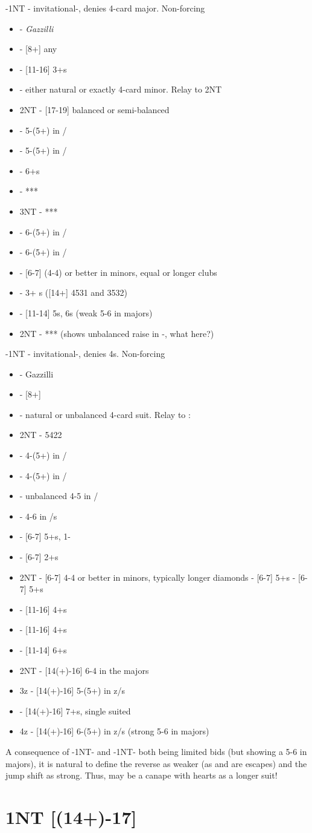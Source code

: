 \documentclass[12pt]{report}
\newcommand{\q}[1]{\multido{}{#1}{\qquad}}
\newcommand{\ul}[1]{\begin{itemize}#1\end{itemize}}
\newcommand{\li}[1]{\item[~] \q{#1}}
\newcommand{\bidsection}[2]{\section{\texorpdfstring{#1}{#2}}}
\begin{document}
{        \li0 -1NT - invitational-, denies 4-card major.  Non-forcing \ul{
            \li0  - \textit{Gazzilli}
                \li1 \di2 - [8+] any
                    \li2 \he2 - [11-16] 3+\cl{}s
                    \li2 \sp2 - either natural or exactly 4-card minor.  Relay to 2NT
                    \li2 2NT - [17-19] balanced or semi-balanced
                    \li2 \cl3 - 5-(5+) in \cl{}/\he{}
                    \li2 \di3 - 5-(5+) in \di{}/\he{}
                    \li2 \he3 - 6+\he{}s
                    \li2 \sp3 - ***
                    \li2 3NT - ***
                    \li2 \cl4 - 6-(5+) in \cl{}/\he{}
                    \li2 \di4 - 6-(5+) in \di{}/\he{}
                \li1 \sp2 - [6-7] (4-4) or better in minors, equal or longer clubs
            \li0 \di2 - 3+ \di{}s ([14+] 4531 and 3532)
            \li0 \sp2 - [11-14] 5\sp{}s, 6\he{}s (weak 5-6 in majors)
            \li0 2NT - *** (shows unbalanced raise in \he1-\sp1, what here?)
        }

        \li0 -1NT - invitational-, denies 4\sp{}s.  Non-forcing \ul{
            \li0  - Gazzilli
                \li1  - [8+]
                    \li2 \he2 - natural or unbalanced 4-card suit.  Relay to \sp2:
                        \li3 2NT - 5422
                        \li3 \cl3 - 4-(5+) in \cl{}/\sp{}
                        \li3 \di3 - 4-(5+) in \di{}/\sp{}
                        \li3 \he3 - unbalanced 4-5 in \he{}/\sp{}
                        \li3 \sp3 - 4-6 in \he{}/\sp{}s
                \li1 \he2 - [6-7] 5+\he{}s, 1-\sp{}
                \li1 \sp2 - [6-7] 2+\sp{}s
                \li1 2NT - [6-7] 4-4 or better in minors, typically longer diamonds
                \cl3 - [6-7] 5+\cl{}s
                \di3 - [6-7] 5+\di{}s
            \li0 \di2 - [11-16] 4+\di{}s
            \li0 \he2 - [11-16] 4+\he{}s
            \li0 \sp2 - [11-14] 6+\sp{}s
            \li0 2NT - [14(+)-16] 6-4 in the majors
            \li0 3z - [14(+)-16] 5-(5+) in z/\sp{}s
            \li0 \sp3 - [14(+)-16] 7+\sp{}s, single suited
            \li0 4z - [14(+)-16] 6-(5+) in z/\sp{}s (strong 5-6 in majors)
        }
    }

    A consequence of -1NT- and -1NT- both being limited bids (but showing a 5-6 in majors), it is natural to define the reverse as weaker (as  and  are escapes) and the jump shift as strong.  Thus,  may be a canape with hearts as a longer suit!
        

\bidsection{1NT [(14+)-17]}{1NT [(14+)-17]} \label{2:7}
\end{document}
